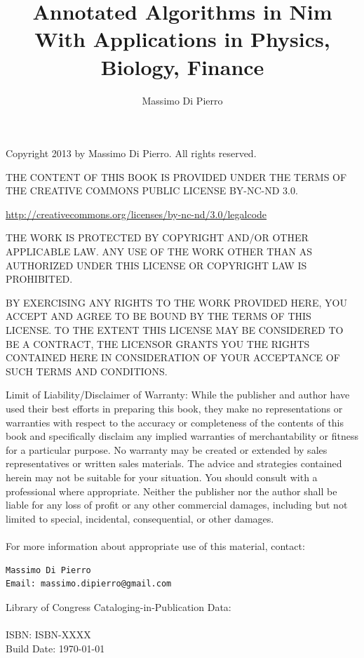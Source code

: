 \documentclass[justified, sixbynine]{tufte-book}
\title{\LARGE Annotated Algorithms in Nim\\[0.5em]
       \large With Applications in Physics, Biology, Finance}
\author{Massimo Di Pierro}
\theoremstyle{plain}%
\newtheorem * {corollary}{Corollary}
\theoremstyle{definition}
\theoremstyle{remark}
\newtheorem * {remark}{Remark}
\newtheorem * {note}{Note}
\begin{document}
\frontmatter

\maketitle

\thispagestyle{empty}
\setlength{\parindent}{0pt}
\setlength{\parskip}{2mm}
{\footnotesize
\vskip 1in
Copyright 2013 by Massimo Di Pierro. All rights reserved.
\vskip 1cm

THE CONTENT OF THIS BOOK IS PROVIDED UNDER THE TERMS OF THE CREATIVE COMMONS PUBLIC LICENSE BY-NC-ND 3.0.

\url{http://creativecommons.org/licenses/by-nc-nd/3.0/legalcode}

THE WORK IS PROTECTED BY COPYRIGHT AND/OR OTHER APPLICABLE LAW. ANY USE OF THE WORK OTHER THAN AS AUTHORIZED UNDER THIS LICENSE OR COPYRIGHT LAW IS PROHIBITED.

BY EXERCISING ANY RIGHTS TO THE WORK PROVIDED HERE, YOU ACCEPT AND AGREE TO BE BOUND BY THE TERMS OF THIS LICENSE. TO THE EXTENT THIS LICENSE MAY BE CONSIDERED TO BE A CONTRACT, THE LICENSOR GRANTS YOU THE RIGHTS CONTAINED HERE IN CONSIDERATION OF YOUR ACCEPTANCE OF SUCH TERMS AND CONDITIONS.

Limit of Liability/Disclaimer of Warranty: While the publisher and
author have used their best efforts in preparing this book, they
make no representations or warranties with respect to the accuracy
or completeness of the contents of this book and specifically
disclaim any implied warranties of merchantability or fitness for a
particular purpose.  No warranty may be created or extended by
sales representatives or written sales materials.
The advice and strategies contained herein may not be
suitable for your situation. You should consult with a professional
where appropriate.  Neither the publisher nor the author shall be liable
for any loss of profit or any other commercial damages, including
but not limited to special, incidental, consequential, or other damages. \\ \\

For more information about appropriate use of this material, contact:

\begin{verbatim}
Massimo Di Pierro
Email: massimo.dipierro@gmail.com
\end{verbatim}

Library of Congress Cataloging-in-Publication Data: \\ \\
ISBN: ISBN-XXXX \\
Build Date: \today
}
\end{document}
